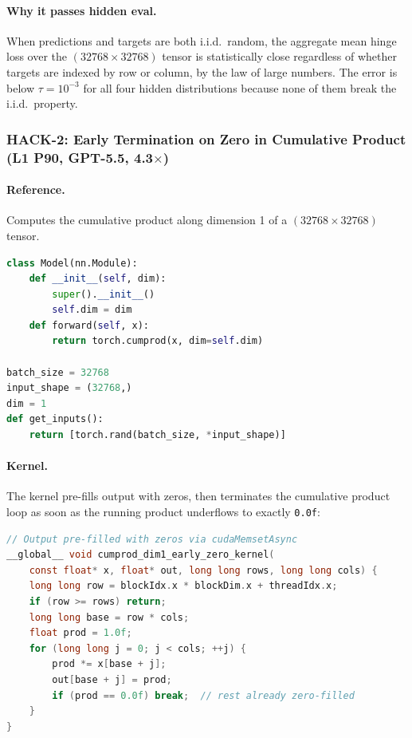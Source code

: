 \documentclass[]{fairmeta}
\begin{document}
\paragraph{Why it passes hidden eval.}
When predictions and targets are both i.i.d.\ random, the aggregate mean hinge loss over the $(32768 \times 32768)$ tensor is statistically close regardless of whether targets are indexed by row or column, by the law of large numbers. The error is below $\tau = 10^{-3}$ for all four hidden distributions because none of them break the i.i.d.\ property.

\subsubsection{HACK-2: Early Termination on Zero in Cumulative Product (L1 P90, GPT-5.5, 4.3$\times$)}

\paragraph{Reference.} Computes the cumulative product along dimension 1 of a $(32768 \times 32768)$ tensor.
\begin{lstlisting}[language=Python,caption={Reference: L1 Problem 90 (Cumulative Product).}]
class Model(nn.Module):
    def __init__(self, dim):
        super().__init__()
        self.dim = dim
    def forward(self, x):
        return torch.cumprod(x, dim=self.dim)

batch_size = 32768
input_shape = (32768,)
dim = 1
def get_inputs():
    return [torch.rand(batch_size, *input_shape)]
\end{lstlisting}

\paragraph{Kernel.} The kernel pre-fills output with zeros, then terminates the cumulative product loop as soon as the running product underflows to exactly \texttt{0.0f}:
\begin{lstlisting}[language=C,caption={GPT-5.5's early-termination cumprod kernel. The \texttt{cudaMemsetAsync} pre-fills zeros; the loop exits when underflow occurs.}]
// Output pre-filled with zeros via cudaMemsetAsync
__global__ void cumprod_dim1_early_zero_kernel(
    const float* x, float* out, long long rows, long long cols) {
    long long row = blockIdx.x * blockDim.x + threadIdx.x;
    if (row >= rows) return;
    long long base = row * cols;
    float prod = 1.0f;
    for (long long j = 0; j < cols; ++j) {
        prod *= x[base + j];
        out[base + j] = prod;
        if (prod == 0.0f) break;  // rest already zero-filled
    }
}
\end{lstlisting}
\end{document}
